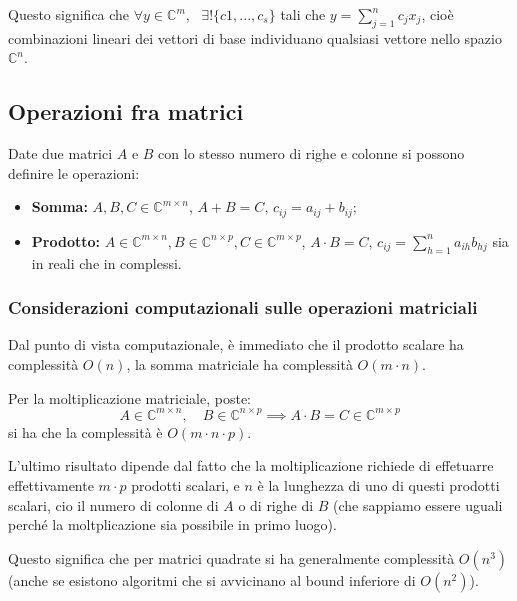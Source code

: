 \documentclass[a4paper,11pt]{article}
\begin{document}
Questo significa che $\forall y \in \mathbb{C}^m$, \ $\exists ! \{c1, ..., c_s\}$ tali che $y = \sum_{j=1}^n c_j x_j$, cioè combinazioni lineari dei vettori di base individuano qualsiasi vettore nello spazio $\mathbb{C}^n$.


\subsection{Operazioni fra matrici}
Date due matrici $A$ e $B$ con lo stesso numero di righe e colonne si possono definire le operazioni:
\begin{itemize}
	\item \textbf{Somma:} $A, B, C \in \mathbb{C}^{m \times n}$, $A + B = C$, $c_{ij} = a_{ij} + b_{ij}$;
	\item \textbf{Prodotto:} $A \in \mathbb{C}^{m \times n}, B \in \mathbb{C}^{n \times p}, C \in \mathbb{C}^{m \times p}$, $A \cdot B = C$, $c_{ij} = \sum_{h = 1}^n a_{ih} b_{hj}$ sia in reali che in complessi. 
\end{itemize}

\subsubsection{Considerazioni computazionali sulle operazioni matriciali}
Dal punto di vista computazionale, è immediato che il prodotto scalare ha complessità $O(n)$, la somma matriciale ha complessità $O(m \cdot n)$.

Per la moltiplicazione matriciale, poste:
$$
A \in \mathbb{C}^{m \times n}, \quad B \in \mathbb{C}^{n \times p}
\implies A \cdot B = C \in \mathbb{C}^{m \times p}
$$
si ha che la complessità è $O(m \cdot n \cdot p)$.

L'ultimo risultato dipende dal fatto che la moltiplicazione richiede di effetuarre effettivamente $m \cdot p$ prodotti scalari, e $n$ è la lunghezza di uno di questi prodotti scalari, cio il numero di colonne di $A$ o di righe di $B$ (che sappiamo essere uguali perché la moltplicazione sia possibile in primo luogo).

Questo significa che per matrici quadrate si ha generalmente complessità $O(n^3)$ (anche se esistono algoritmi che si avvicinano al bound inferiore di $O(n^2)$).
\end{document}

